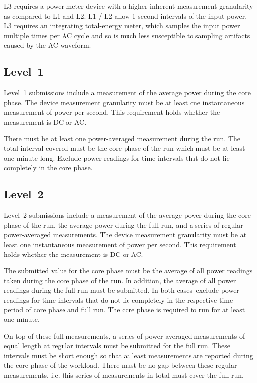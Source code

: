 \noindent
L3 requires a power-meter device with a higher inherent measurement granularity as compared to L1 and L2.
L1 / L2 allow 1-second intervals of the input power.
L3 requires an integrating total-energy meter, which samples the input power multiple times per AC cycle and so is much less susceptible to sampling artifacts caused by the AC waveform.

\subsection{Level~1}
\noindent
Level~1 submissions include a measurement of the average power during the core phase.
The device measurement granularity must be at least one instantaneous measurement of power per second.
This requirement holds whether the measurement is DC or AC.
\wl

\noindent
There must be at least one power-averaged measurement during the run.
The total interval covered must be the core phase of the run which must be at least one minute long.
Exclude power readings for time intervals that do not lie completely in the core phase.
\wl

\subsection{Level~2}
\noindent
Level~2 submissions include a measurement of the average power during the core phase of the run, the average power during the full run, and a series of regular power-averaged measurements.
The device measurement granularity must be at least one instantaneous measurement of power per second.
This requirement holds whether the measurement is DC or AC.
\wl

\noindent
The submitted value for the core phase must be the average of all power readings taken during the core phase of the run.
In addition, the average of all power readings during the full run must be submitted.
In both cases, exclude power readings for time intervals that do not lie completely in the respective time period of core phase and full run.
The core phase is required to run for at least one minute.
\wl

\noindent
On top of these full measurements, a series of power-averaged measurements of equal length at regular intervals must be submitted for the full run.
These intervals must be short enough so that at least \MinMeasurementsCorePhaseLTwoThree{} measurements are reported during the core phase of the workload.
There must be no gap between these regular measurements, i.e. this series of measurements in total must cover the full run.
\wl


